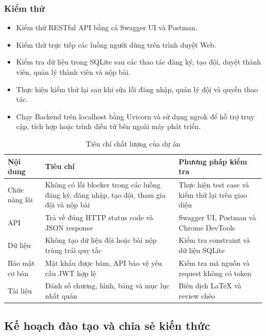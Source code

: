 \subsubsection{Kiểm thử}

\begin{itemize}
    \item Kiểm thử RESTful API bằng cả Swagger UI và Postman.
    \item Kiểm thử trực tiếp các luồng người dùng trên trình duyệt Web.
    \item Kiểm tra dữ liệu trong SQLite sau các thao tác đăng ký, tạo đội, duyệt thành viên, quản lý thành viên và nộp bài.
    \item Thực hiện kiểm thử lại sau khi sửa lỗi đăng nhập, quản lý đội và quyền thao tác.
    \item Chạy Backend trên localhost bằng Uvicorn và sử dụng ngrok để hỗ trợ truy cập, tích hợp hoặc trình diễn từ bên ngoài máy phát triển.
\end{itemize}

\begin{table}[H]
    \centering
    \caption{Tiêu chí chất lượng của dự án}
    \label{tab:quality-criteria}
    \renewcommand{\arraystretch}{1.35}
    \begin{tabularx}{\textwidth}{|p{4cm}|p{4.2cm}|Y|}
        \hline
        \textbf{Nội dung} & \textbf{Tiêu chí} & \textbf{Phương pháp kiểm tra} \\
        \hline
        Chức năng lõi & Không có lỗi blocker trong các luồng đăng ký, đăng nhập, tạo đội, tham gia đội và nộp bài & Thực hiện test case và kiểm thử lại trên giao diện \\
        \hline
        API & Trả về đúng HTTP status code và JSON response & Swagger UI, Postman và Chrome DevTools \\
        \hline
        Dữ liệu & Không tạo dữ liệu đội hoặc bài nộp trùng trái quy tắc & Kiểm tra constraint và dữ liệu SQLite \\
        \hline
        Bảo mật cơ bản & Mật khẩu được băm, API bảo vệ yêu cầu JWT hợp lệ & Kiểm tra mã nguồn và request không có token \\
        \hline
        Tài liệu & Đánh số chương, hình, bảng và mục lục nhất quán & Biên dịch LaTeX và review chéo \\
        \hline
    \end{tabularx}
\end{table}

\subsection{Kế hoạch đào tạo và chia sẻ kiến thức}

